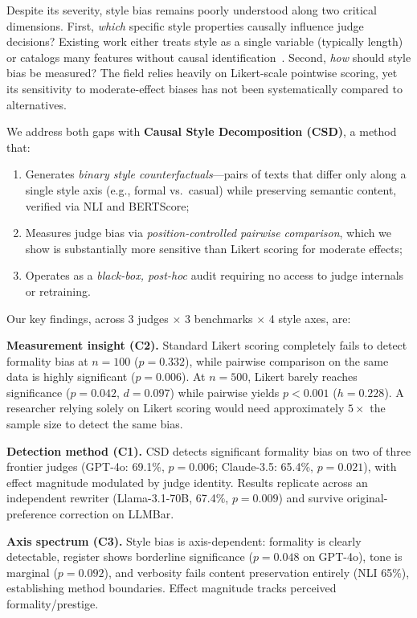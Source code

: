 \documentclass[11pt,a4paper]{article}
\begin{document}
Despite its severity, style bias remains poorly understood along two critical dimensions.
First, \emph{which} specific style properties causally influence judge decisions? Existing work either treats style as a single variable (typically length)~\cite{dubois2024length} or catalogs many features without causal identification~\cite{casse2026}.
Second, \emph{how} should style bias be measured? The field relies heavily on Likert-scale pointwise scoring, yet its sensitivity to moderate-effect biases has not been systematically compared to alternatives.

We address both gaps with \textbf{Causal Style Decomposition (CSD)}, a method that:
\begin{enumerate}
    \item Generates \emph{binary style counterfactuals}---pairs of texts that differ only along a single style axis (e.g., formal vs.\ casual) while preserving semantic content, verified via NLI and BERTScore;
    \item Measures judge bias via \emph{position-controlled pairwise comparison}, which we show is substantially more sensitive than Likert scoring for moderate effects;
    \item Operates as a \emph{black-box, post-hoc} audit requiring no access to judge internals or retraining.
\end{enumerate}

Our key findings, across 3 judges $\times$ 3 benchmarks $\times$ 4 style axes, are:

\noindent\textbf{Measurement insight (C2).} Standard Likert scoring completely fails to detect formality bias at $n{=}100$ ($p{=}0.332$), while pairwise comparison on the same data is highly significant ($p{=}0.006$).
At $n{=}500$, Likert barely reaches significance ($p{=}0.042$, $d{=}0.097$) while pairwise yields $p{<}0.001$ ($h{=}0.228$).
A researcher relying solely on Likert scoring would need approximately $5{\times}$ the sample size to detect the same bias.

\noindent\textbf{Detection method (C1).} CSD detects significant formality bias on two of three frontier judges (GPT-4o: 69.1\%, $p{=}0.006$; Claude-3.5: 65.4\%, $p{=}0.021$), with effect magnitude modulated by judge identity. Results replicate across an independent rewriter (Llama-3.1-70B, 67.4\%, $p{=}0.009$) and survive original-preference correction on LLMBar.

\noindent\textbf{Axis spectrum (C3).} Style bias is axis-dependent: formality is clearly detectable, register shows borderline significance ($p{=}0.048$ on GPT-4o), tone is marginal ($p{=}0.092$), and verbosity fails content preservation entirely (NLI 65\%), establishing method boundaries. Effect magnitude tracks perceived formality/prestige.
\end{document}
